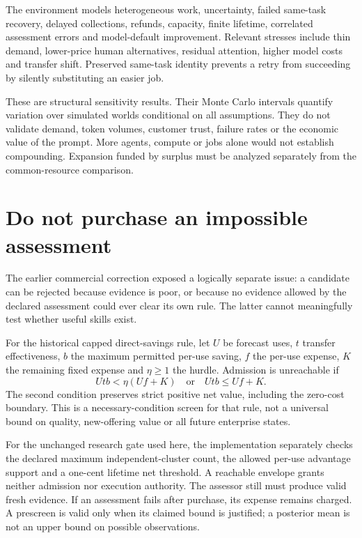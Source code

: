 \documentclass[11pt,letterpaper]{article}
\begin{document}
The environment models heterogeneous work, uncertainty, failed same-task recovery, delayed collections, refunds, capacity, finite lifetime, correlated assessment errors and model-default improvement. Relevant stresses include thin demand, lower-price human alternatives, residual attention, higher model costs and transfer shift. Preserved same-task identity prevents a retry from succeeding by silently substituting an easier job.



These are structural sensitivity results. Their Monte Carlo intervals quantify variation over simulated worlds conditional on all assumptions. They do not validate demand, token volumes, customer trust, failure rates or the economic value of the prompt. More agents, compute or jobs alone would not establish compounding. Expansion funded by surplus must be analyzed separately from the common-resource comparison.

\section{Do not purchase an impossible assessment}
The earlier commercial correction exposed a logically separate issue: a candidate can be rejected because evidence is poor, or because no evidence allowed by the declared assessment could ever clear its own rule. The latter cannot meaningfully test whether useful skills exist.

For the historical capped direct-savings rule, let $U$ be forecast uses, $t$ transfer effectiveness, $b$ the maximum permitted per-use saving, $f$ the per-use expense, $K$ the remaining fixed expense and $\eta\geq1$ the hurdle. Admission is unreachable if
\[
Utb < \eta(Uf+K)\quad\text{or}\quad Utb\leq Uf+K.
\]
The second condition preserves strict positive net value, including the zero-cost boundary. This is a necessary-condition screen for that rule, not a universal bound on quality, new-offering value or all future enterprise states.

For the unchanged research gate used here, the implementation separately checks the declared maximum independent-cluster count, the allowed per-use advantage support and a one-cent lifetime net threshold. A reachable envelope grants neither admission nor execution authority. The assessor still must produce valid fresh evidence. If an assessment fails after purchase, its expense remains charged. A prescreen is valid only when its claimed bound is justified; a posterior mean is not an upper bound on possible observations.
\end{document}
